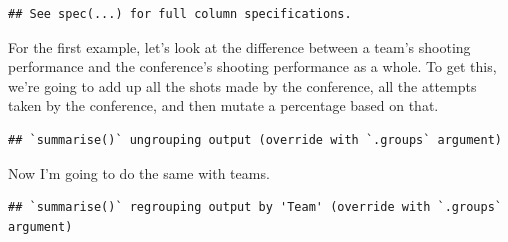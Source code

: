 \documentclass[
]{book}
\newenvironment{Shaded}{\begin{snugshade}}{\end{snugshade}}
\newcommand{\DataTypeTok}[1]{\textcolor[rgb]{0.13,0.29,0.53}{#1}}
\newcommand{\KeywordTok}[1]{\textcolor[rgb]{0.13,0.29,0.53}{\textbf{#1}}}
\newcommand{\NormalTok}[1]{#1}
\newcommand{\OperatorTok}[1]{\textcolor[rgb]{0.81,0.36,0.00}{\textbf{#1}}}
\newcommand{\StringTok}[1]{\textcolor[rgb]{0.31,0.60,0.02}{#1}}
\begin{document}
\begin{verbatim}
## See spec(...) for full column specifications.
\end{verbatim}

For the first example, let's look at the difference between a team's shooting performance and the conference's shooting performance as a whole. To get this, we're going to add up all the shots made by the conference, all the attempts taken by the conference, and then mutate a percentage based on that.

\begin{Shaded}
\end{Shaded}

\begin{verbatim}
## `summarise()` ungrouping output (override with `.groups` argument)
\end{verbatim}

Now I'm going to do the same with teams.

\begin{Shaded}
\end{Shaded}

\begin{verbatim}
## `summarise()` regrouping output by 'Team' (override with `.groups` argument)
\end{verbatim}
\end{document}
